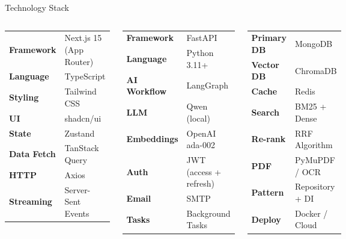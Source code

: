 \documentclass[aspectratio=169,12pt]{beamer}
\begin{document}
\begin{frame}{Technology Stack}
\begin{columns}[T]
  \begin{tcolorbox}[mybox,title={\faReact\; Frontend}]
    \tiny
    \begin{tabular}{@{}ll@{}}
    \textbf{Framework} & Next.js 15 (App Router)\\
    \textbf{Language} & TypeScript\\
    \textbf{Styling} & Tailwind CSS\\
    \textbf{UI} & shadcn/ui\\
    \textbf{State} & Zustand\\
    \textbf{Data Fetch} & TanStack Query\\
    \textbf{HTTP} & Axios\\
    \textbf{Streaming} & Server-Sent Events\\
    \end{tabular}
  \end{tcolorbox}

  \begin{tcolorbox}[mybox,title={\faPython\; Backend}]
    \tiny
    \begin{tabular}{@{}ll@{}}
    \textbf{Framework} & FastAPI\\
    \textbf{Language} & Python 3.11+\\
    \textbf{AI Workflow} & LangGraph\\
    \textbf{LLM} & Qwen (local)\\
    \textbf{Embeddings} & OpenAI ada-002\\
    \textbf{Auth} & JWT (access + refresh)\\
    \textbf{Email} & SMTP\\
    \textbf{Tasks} & Background Tasks\\
    \end{tabular}
  \end{tcolorbox}

  \begin{tcolorbox}[mybox,title={\faDatabase\; Data Layer}]
    \tiny
    \begin{tabular}{@{}ll@{}}
    \textbf{Primary DB} & MongoDB\\
    \textbf{Vector DB} & ChromaDB\\
    \textbf{Cache} & Redis\\
    \textbf{Search} & BM25 + Dense\\
    \textbf{Re-rank} & RRF Algorithm\\
    \textbf{PDF} & PyMuPDF / OCR\\
    \textbf{Pattern} & Repository + DI\\
    \textbf{Deploy} & Docker / Cloud\\
    \end{tabular}
  \end{tcolorbox}
\end{columns}


\end{frame}
\end{document}
